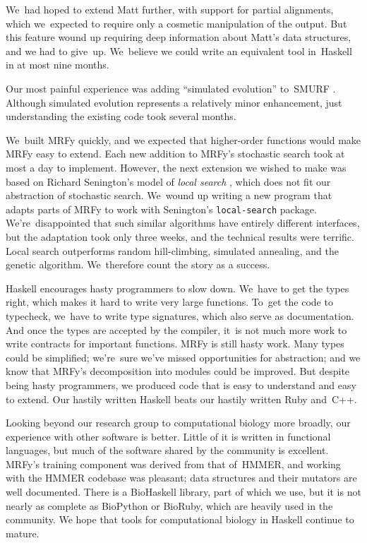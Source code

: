 \documentclass[]{jfp1}
\let\cite\citep
\begin{document}
We~had hoped to extend Matt further, with support for partial alignments,
which we~expected to require only 
a cosmetic manipulation of the 
output.
But
this feature wound up
requiring deep information about Matt's data structures,
and we had to give~up.
We~believe we could write an equivalent tool in~Haskell
in at most nine months.

Our most painful experience was adding ``simulated evolution''
to~SMURF \cite{Daniels:2012}. 
Although simulated evolution represents a relatively minor
enhancement,
just understanding the existing code took several months.

We~built MRFy quickly, and we expected that
higher-order functions would make MRFy easy to extend.
Each new addition to MRFy's stochastic search took at most a day
to implement.
However, the next extension we wished to make
was based on
Richard Senington's model of \emph{local
search} \cite{senington:hybrid}, 
which does not fit our abstraction of stochastic search.
We~wound up writing a new program that adapts parts
of MRFy to work with Senington's  \texttt{local-search} package.
We're~disappointed that such similar algorithms have entirely
different interfaces,
but the adaptation took only three weeks, and the
technical results were terrific. 
Local search outperforms random hill-climbing, simulated
annealing, and the genetic algorithm.
We~therefore count the story as a success.




Haskell encourages hasty programmers to slow down.
We~have to get the types right,
which makes it hard to write very large functions.
To~get the code to typecheck, we~have to write type signatures, which
also serve as documentation.
And once the types are accepted by the compiler,
it~is not much more work to write contracts for important functions.
MRFy is still hasty work.
Many types could be simplified;
we're~sure we've missed opportunities for abstraction;
and we know that MRFy's decomposition into modules could be improved.
But despite being hasty programmers, we produced code 
that is easy to understand and easy to extend.
Our hastily written Haskell beats
our hastily written Ruby and~C++.

\ifpagetuning\enlargethispage{\baselineskip}\fi


Looking beyond our research group to computational biology more
broadly, our experience with other software is better.
Little of it is written in functional languages, 
but much of the software shared by the community is excellent.
MRFy's training component was derived from that of~HMMER,
and
working with the HMMER 
codebase was pleasant;
data structures and their
mutators are well documented. 
There is a 
BioHaskell library, part of which we use,
but it is not nearly as 
complete as BioPython or BioRuby, which are heavily used in the community.
We hope that tools for computational biology in
Haskell continue to mature. 
\end{document}
